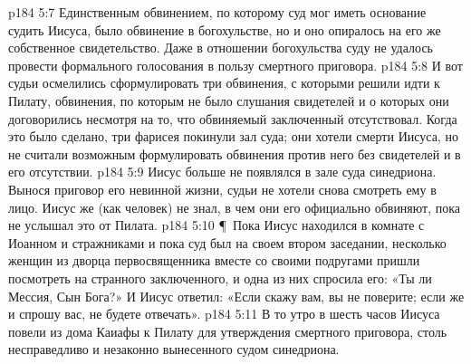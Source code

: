 \vs p184 5:7 Единственным обвинением, по которому суд мог иметь основание судить Иисуса, было обвинение в богохульстве, но и оно опиралось на его же собственное свидетельство. Даже в отношении богохульства суду не удалось провести формального голосования в пользу смертного приговора.
\vs p184 5:8 И вот судьи осмелились сформулировать три обвинения, с которыми решили идти к Пилату, обвинения, по которым не было слушания свидетелей и о которых они договорились несмотря на то, что обвиняемый заключенный отсутствовал. Когда это было сделано, три фарисея покинули зал суда; они хотели смерти Иисуса, но не считали возможным формулировать обвинения против него без свидетелей и в его отсутствии.
\vs p184 5:9 Иисус больше не появлялся в зале суда синедриона. Вынося приговор его невинной жизни, судьи не хотели снова смотреть ему в лицо. Иисус же (как человек) не знал, в чем они его официально обвиняют, пока не услышал это от Пилата.
\vs p184 5:10 \P\ Пока Иисус находился в комнате с Иоанном и стражниками и пока суд был на своем втором заседании, несколько женщин из дворца первосвященника вместе со своими подругами пришли посмотреть на странного заключенного, и одна из них спросила его: «Ты ли Мессия, Сын Бога?» И Иисус ответил: «Если скажу вам, вы не поверите; если же и спрошу вас, не будете отвечать».
\vs p184 5:11 В то утро в шесть часов Иисуса повели из дома Каиафы к Пилату для утверждения смертного приговора, столь несправедливо и незаконно вынесенного судом синедриона.
